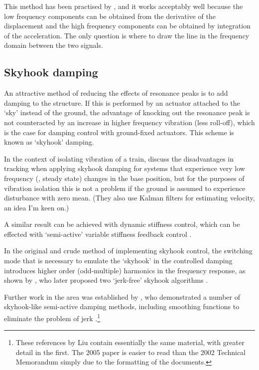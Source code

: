 This method has been practised by \textcite{bennett2007}, and it works
acceptably well because the low frequency components can be obtained
from the derivative of the displacement and the high frequency
components can be obtained by integration of the acceleration. The
only question is where to draw the line in the frequency domain
between the two signals.




\subsection{Skyhook damping}

An attractive method of reducing the effects of resonance peaks is to add
damping to the structure. If this is performed by an actuator attached to the
`sky' instead of the ground, the advantage of knocking out the resonance peak
is not counteracted by an increase in higher frequency vibration (less
roll-off), which is the case for damping control with ground-fixed actuators.
This scheme is known as `skyhook' damping.

In the context of isolating vibration of a train, \textcite{li1999} discuss
the disadvantages in tracking when applying skyhook damping for systems that
experience very low frequency (\ie, steady state) changes in the base
position, but for the purposes of vibration isolation this is not a problem if
the ground is assumed to experience disturbance with zero mean. (They also use
Kalman filters for estimating velocity, an idea I'm keen on.)

A similar result  can be achieved with dynamic stiffness control,
which can be effected with `semi-active' variable stiffness feedback control
\cite{leavitt2007}.

In the original and crude method of implementing skyhook control, the
switching mode that is necessary to emulate the `skyhook' in the controlled
damping introduces higher order (odd-multiple) harmonics in the frequency
response, as shown by \textcite{ahmadian2001}, who later proposed two
`jerk-free' skyhook algorithms \cite{ahmadian2004}.

Further work in the area was established by \textcite{liu2002}, who
demonstrated a number of skyhook-like semi-active damping methods, including
smoothing functions to eliminate the problem of jerk
\cite{liu2005}.\footnote{These references by Liu contain essentially the same
material, with greater detail in the first. The 2005 paper is easier to read
than the 2002 Technical Memorandum simply due to the formatting of the
documents.}

